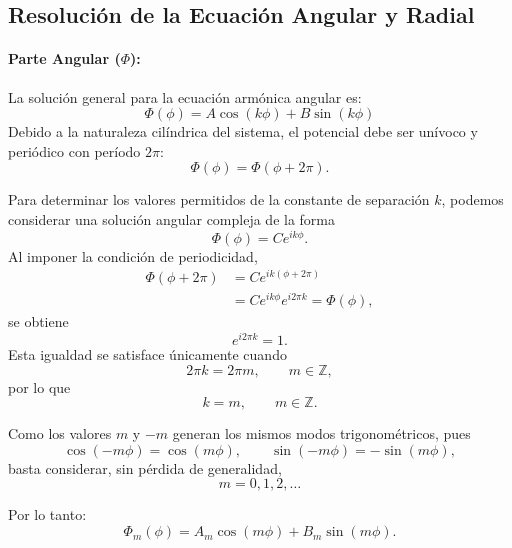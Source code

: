 \documentclass[11pt]{article}
\begin{document}
\subsection*{Resolución de la Ecuación Angular y Radial}

\paragraph{Parte Angular ($\Phi$):}
La solución general para la ecuación armónica angular es:
\begin{equation*}
\Phi(\phi) = A \cos(k\phi) + B \sin(k\phi)
\end{equation*}
Debido a la naturaleza cilíndrica del sistema, el potencial debe ser
unívoco y periódico con período $2\pi$:
\begin{equation*}
    \Phi(\phi)=\Phi(\phi+2\pi).
\end{equation*}

Para determinar los valores permitidos de la constante de separación $k$,
podemos considerar una solución angular compleja de la forma
\begin{equation*}
    \Phi(\phi)=C e^{ik\phi}.
\end{equation*}
Al imponer la condición de periodicidad,
\begin{align*}
    \Phi(\phi+2\pi)
    &= C e^{ik(\phi+2\pi)} \\
    &= C e^{ik\phi}e^{i2\pi k}
    = \Phi(\phi),
\end{align*}
se obtiene
\begin{equation*}
    e^{i2\pi k}=1.
\end{equation*}
Esta igualdad se satisface únicamente cuando
\begin{equation*}
    2\pi k = 2\pi m,
    \qquad m\in\mathbb{Z},
\end{equation*}
por lo que
\begin{equation*}
    k=m,
    \qquad m\in\mathbb{Z}.
\end{equation*}

Como los valores $m$ y $-m$ generan los mismos modos trigonométricos,
pues
\begin{equation*}
    \cos(-m\phi)=\cos(m\phi),
    \qquad
    \sin(-m\phi)=-\sin(m\phi),
\end{equation*}
basta considerar, sin pérdida de generalidad,
\begin{equation*}
    m=0,1,2,\dots
\end{equation*}

Por lo tanto:
\begin{equation*}
    \Phi_m(\phi)
    =
    A_m\cos(m\phi)+B_m\sin(m\phi).
\end{equation*}
\end{document}
